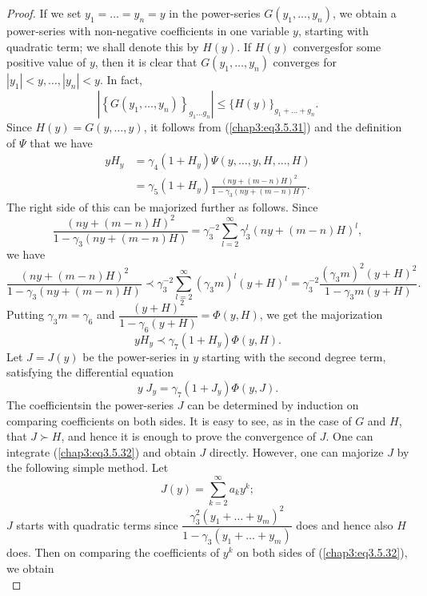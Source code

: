 \begin{proof}
If we set $y_1 = \ldots = y_n = y$ in the power-series $G(y_1, \ldots,
y_n)$, we obtain a power-series with non-negative coefficients in one
variable $y$, starting with quadratic term; we shall denote this by
$H(y)$. If $H(y)$  converges\pageoriginale for some positive value of
$y$, then it is clear that $G(y_1 , \ldots, y_n)$ converges for $|y_1|
< y, \ldots , |y_n| < y$. In fact, 
$$
\left|\left\{ G(y_1, \ldots, y_n)\right\}_{g_1 \ldots g_n}  \right|
\leq \{H(y)\}_{g_1+ \ldots + g_n}.  
$$
Since $H(y) =G(y, \ldots, y)$, it follows from (\ref{chap3:eq3.5.31})
and the definition of $\Psi$ that we have  
\begin{align*}
y H_y & = \gamma_4 (1+H_y) \Psi (y, \ldots, y, H, \ldots, H )\\
& = \gamma_5 (1+ H_y) \frac{(ny+ (m-n) H)^2}{1-\gamma_3 (ny + (m-n) H)}.
\end{align*}
The right side of this can be majorized further as follows. Since
$$
\frac{(ny + (m-n) H)^2}{1-\gamma_3 (ny + (m-n)H)} = \gamma^{-2}_3
\sum\limits^{\infty}_{l=2}  \gamma^l_3 (ny + (m-n) H)^l,  
$$
we have
$$
\frac{(ny+(m-n) H)^2}{1-\gamma_3 (ny + (m-n) H)} \prec \gamma^{-2}_3
\sum\limits^\infty_{l=2} (\gamma_3 m)^l (y+H)^l = \gamma^{-2}_3
\frac{(\gamma_3m)^2 (y+H)^2}{1-\gamma_3 m (y+H)}.  
$$
Putting $\gamma_3 m = \gamma_6$ and $\dfrac{(y+H)^2}{1-\gamma_6 (y+H)}
= \Phi (y,H)$, we get the majorization 
$$
y H_y \prec \gamma_7 (1+ H_y) \Phi (y,H).
$$
Let $J = J (y)$ be the power-series in $y$ starting with the second
degree term, satisfying the differential equation 
\begin{equation*}
y \; J_y = \gamma_7 (1+ J_y) \Phi (y,
J).\tag{3.5.32}\label{chap3:eq3.5.32} 
\end{equation*}
The coefficients\pageoriginale in the power-series $J$ can be
determined by induction on comparing coefficients on both sides. It is
easy to see, as in the case of $G$ and $H$, that $J \succ H$, and
hence it is enough to prove the convergence of $J$. One can integrate
(\ref{chap3:eq3.5.32}) and obtain $J$ directly. However, one can
majorize $J$ by the following simple method. Let 
\begin{equation*}
J(y) = \sum\limits^\infty_{k=2} a_k y^k;
\tag{3.5.33}\label{chap3:eq3.5.33} 
\end{equation*}
$J$ starts with quadratic terms since $\dfrac{\gamma^2_3 (y_1 + \ldots
  + y_m)^2}{1-\gamma_3(y_1 + \ldots + y_m)}$ does and hence also $H$
does. Then on comparing the coefficients of $y^k$ on both sides of
(\ref{chap3:eq3.5.32}), we obtain 
\begin{equation*}

\end{equation*}
\end{proof}
